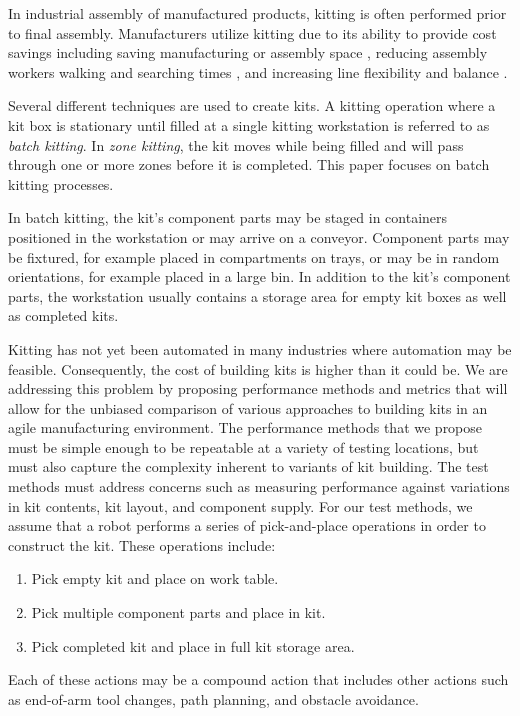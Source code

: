 In industrial assembly of manufactured products, kitting is 
often performed prior to final assembly. Manufacturers utilize kitting
due to its ability to provide cost savings \cite{Carlsson_2008} 
including saving manufacturing or assembly space \cite{Medbo2003}, 
reducing assembly workers walking and searching times \cite{Schwind1992}, 
and increasing line flexibility \cite{Bozer1992} and balance \cite{Jiao2000}.

Several different techniques are used to create kits. A kitting 
operation where a kit box is stationary until filled at a single
kitting workstation is referred to as {\it batch kitting}. 
In {\it zone kitting}, the kit moves while being filled and will pass through one or
more zones before it is completed. This paper focuses on batch kitting processes.

In batch kitting, the kit's component parts may be staged in 
containers positioned in the workstation or may arrive on a conveyor.
Component parts may be fixtured, for example placed in compartments 
on trays, or may be in random orientations, for example
placed in a large bin. In addition to the kit's component parts, 
the workstation usually contains a storage area for empty kit boxes as
well as completed kits.

Kitting has not yet been automated in many industries where 
automation may be feasible. Consequently, the cost of building 
kits is higher than it could be. We are addressing this problem 
by proposing performance methods and metrics that will allow for 
the unbiased comparison of various approaches to building kits  
in an agile manufacturing environment. The performance methods 
that we propose must be simple enough to be repeatable at a variety of 
testing locations, but must also capture the complexity inherent 
to variants of kit building. The test methods must address concerns such as
measuring performance against variations in kit contents, kit 
layout, and component supply. For our test methods, we assume that 
a robot performs a series of pick-and-place operations
in order to construct the kit. These operations include:
\begin{enumerate}
\item Pick empty kit and place on work table.
\item Pick multiple component parts and place in kit.
\item Pick completed kit and place in full kit storage area.
\end{enumerate}
Each of these actions may be a compound action that includes 
other actions such as end-of-arm tool changes, path planning,
and obstacle avoidance.

